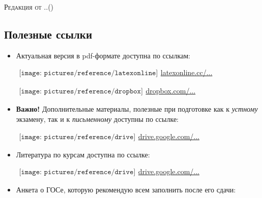 {\LARGE\scshape Редакция от \twodigit\day.\twodigit\month.\the\year \;(\currenttime)}\par 

\vspace*{-1\baselineskip}  
\begin{flushleft}
\section*{\Large Полезные ссылки}
\begin{itemize}[wide, labelwidth=!, labelindent=0pt, label=$\blacktriangleright$, noitemsep]
\item Актуальная версия в pdf-формате доступна по ссылкам:

\qquad\href{http://latexonline.cc/compile?git=https://github.com/DidenkoAndre/GOS_book&target=_main.tex&download=GOSBook_Matan.pdf&command=pdflatex}{$
\begin{array}{l}
\texttt{[image: pictures/reference/latexonline]}
\end{array}
$\large latexonline.cc/...}

\qquad\href{https://www.dropbox.com/sh/7e5mfj8q68o2ipp/AAD8XvpZhiJzFbEh_IeH305ia?dl=0&preview=GOSBook.pdf}{$
\begin{array}{l}
\texttt{[image: pictures/reference/dropbox]}
\end{array}
$\large dropbox.com/...}

\item \textbf{Важно!} Дополнительные материалы, полезные при подготовке как к \textit{устному} экзамену, так и к \textit{письменному} доступны по ссылке:

\qquad\href{https://drive.google.com/drive/u/0/folders/0BzuzEyNkpwYDYjVNcE0wa3hqWjA}{$
\begin{array}{l}
\texttt{[image: pictures/reference/drive]}
\end{array}
$\large drive.google.com/...}

\item Литература по курсам доступна по ссылке:

\qquad\href{https://drive.google.com/drive/u/0/folders/0BzuzEyNkpwYDcENXcV9jNWdwVlU}{$
\begin{array}{l}
\texttt{[image: pictures/reference/drive]}
\end{array}
$\large drive.google.com/...}

\item Анкета о ГОСе, которую рекомендую всем заполнить после его сдачи:


\end{itemize}
\end{flushleft}
